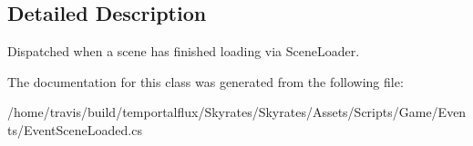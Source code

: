 \subsection{Detailed Description}
Dispatched when a scene has finished loading via Scene\-Loader. 



The documentation for this class was generated from the following file\-:\begin{DoxyCompactItemize}
\item 
/home/travis/build/temportalflux/\-Skyrates/\-Skyrates/\-Assets/\-Scripts/\-Game/\-Events/Event\-Scene\-Loaded.\-cs\end{DoxyCompactItemize}
